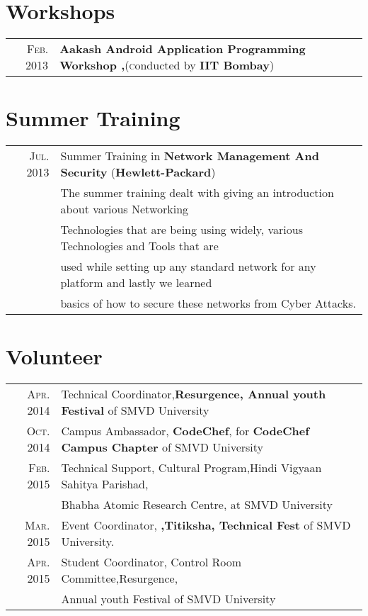 \documentclass[a4paper,10pt]{article}
\begin{document}
\section{Workshops}
\begin{tabular}{rl}
 \textsc{Feb.} 2013 & {\normalsize\textbf{Aakash Android Application Programming Workshop ,}}(\textsc conducted by \normalsize\textbf{IIT Bombay})\\
\end{tabular}

\section{Summer Training}
\begin{tabular}{rl}
 \textsc{Jul.} 2013 & Summer Training in \large\textbf{Network Management And Security} (\normalsize\textbf{Hewlett-Packard})\normalsize\\ & The summer training dealt with giving an introduction about various Networking \\ & Technologies that are being using widely, various Technologies and Tools that are\\ & used while setting up any standard network for any platform and lastly we learned \\ & basics of how to secure these networks from Cyber Attacks.   \\
 
\end{tabular}

\section{Volunteer}
\begin{tabular}{rl}
 \textsc{Apr.} 2014 & Technical Coordinator,\normalsize\textbf{Resurgence, Annual youth Festival} of SMVD University\\
 \textsc{Oct.} 2014 & Campus Ambassador,\normalsize\textbf{   CodeChef}, for \normalsize\textbf{CodeChef Campus Chapter} of SMVD University\\
  \textsc{Feb.} 2015 & Technical Support, Cultural Program,Hindi Vigyaan Sahitya Parishad, \\  & Bhabha Atomic Research Centre, at SMVD University\\
 \textsc{Mar.} 2015 & Event Coordinator,\normalsize\textbf{  ,Titiksha, Technical Fest} of SMVD University. \\
 \textsc{Apr.} 2015 & Student Coordinator, Control Room Committee,Resurgence, \\ & Annual youth Festival of SMVD University\\

\end{tabular}
\end{document}
